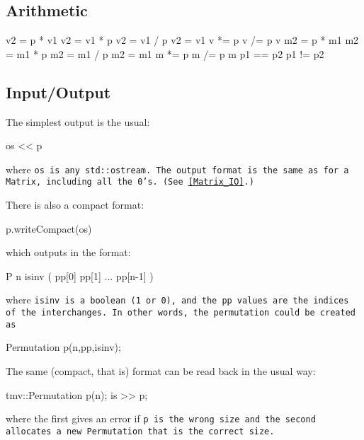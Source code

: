 \subsection{Arithmetic}
\label{Permutation_Arithmetic}

\begin{tmvcode}
v2 = p * v1
v2 = v1 * p
v2 = v1 / p
v2 = v1 %
v *= p
v /= p
v %
m2 = p * m1
m2 = m1 * p
m2 = m1 / p
m2 = m1 %
m *= p
m /= p
m %
p1 == p2
p1 != p2
\end{tmvcode}

\subsection{Input/Output}
\label{Permutation_IO}

The simplest output is the usual:
\begin{tmvcode}
os << p
\end{tmvcode}
where \tt{os} is any \tt{std::ostream}.
The output format is the same as for a \tt{Matrix}, including all the 0's.
(See \ref{Matrix_IO}.)

There is also a compact format:
\begin{tmvcode}
p.writeCompact(os)
\end{tmvcode}
which outputs in the format:
\begin{tmvcode}
P n isinv ( pp[0]  pp[1]  ...  pp[n-1] )
\end{tmvcode}
where \tt{isinv} is a boolean (1 or 0), and the \tt{pp} values are the 
indices of the interchanges.
In other words, the permutation could be created as
\begin{tmvcode}
Permutation p(n,pp,isinv);
\end{tmvcode}

The same (compact, that is) format can be read back in the usual way:
\begin{tmvcode}
tmv::Permutation p(n);
is >> p;
\end{tmvcode}
where the first gives an error if \tt{p} is the wrong size and the second allocates
a new \tt{Permutation} that is the correct size.


